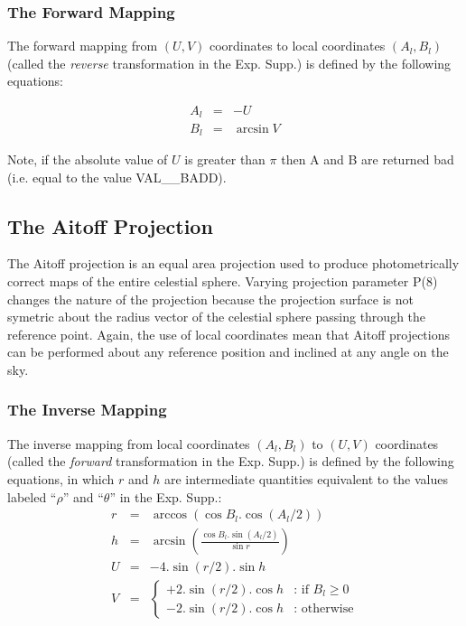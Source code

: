 \subsubsection {The Forward Mapping}
The forward mapping from $(U,V)$ coordinates to local coordinates
$(A_{l},B_{l})$ (called the {\em reverse} transformation in the Exp. Supp.) is
defined by the following equations:

\begin{eqnarray*}
A_{l} & = & -U\\
B_{l} & = & \arcsin V
\end{eqnarray*}

Note, if the absolute value of $U$ is greater than $\pi$ then A and B are
returned bad (i.e. equal to the value VAL\_\_BADD).

\subsection {The Aitoff Projection}
The Aitoff projection is an equal area projection used to produce
photometrically correct maps of the entire celestial sphere. Varying projection
parameter P(8) changes the nature of the projection because the projection
surface is not symetric about the radius vector of the celestial sphere passing
through the reference point. Again, the use of local coordinates mean that
Aitoff projections can be performed about any reference position and inclined at
any angle on the sky.

\subsubsection {The Inverse Mapping}
The inverse mapping from local coordinates $(A_{l},B_{l})$ to $(U,V)$
coordinates
(called the {\em forward} transformation in the Exp. Supp.) is defined by the
following equations, in which $r$ and $h$ are intermediate quantities equivalent
to the values labeled ``$\rho$'' and ``$\theta$'' in the Exp. Supp.:
\begin{eqnarray*}
r & = & \arccos (\cos B_{l}.\cos (A_{l}/2) )\\
h & = & \arcsin \left(\frac {\cos B_{l}.\sin(A_{l}/2)}{\sin r}\right)\\
U & = & -4.\sin (r/2).\sin h\\
V & = & \left\{ \begin{array}{ll}
                 +2.\sin(r/2).\cos h   & \mbox{: if $B_{l}\geq0$}\\
                 -2.\sin(r/2).\cos h   & \mbox{: otherwise}
                \end{array}
        \right.\\
\end{eqnarray*}

